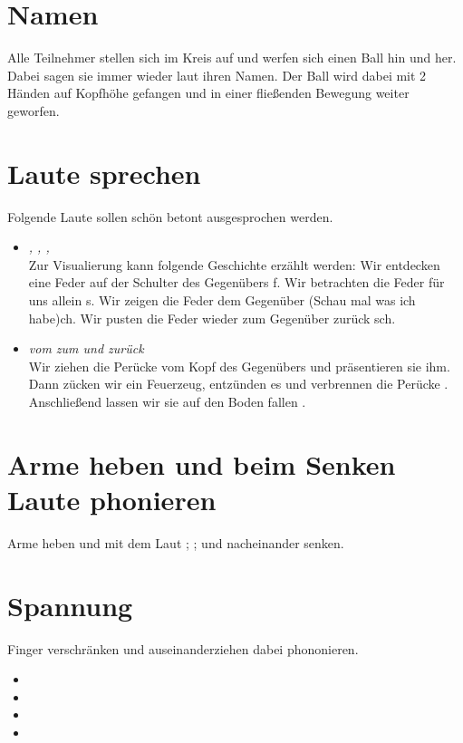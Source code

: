 \documentclass[ngerman, a4paper, twoside]{scrbook}%
\begin{document}
	\section{Namen}
	 Alle Teilnehmer stellen sich im Kreis auf und werfen sich einen Ball hin und her. Dabei sagen sie immer wieder laut ihren Namen. Der Ball wird dabei mit 2 Händen auf Kopfhöhe gefangen und in einer fließenden Bewegung weiter geworfen.

	 \section{Laute sprechen}
	 Folgende Laute sollen schön betont ausgesprochen werden.
	  \begin{itemize}
	  	\item \emph{\textipa{[f]}, \textipa{[s]}, \textipa{[\c{c}]}, \textipa{[\textesh]}}\\
	  	Zur Visualierung kann folgende Geschichte erzählt werden: Wir entdecken eine Feder auf der Schulter des Gegenübers {f}. Wir betrachten die Feder für uns allein {s}. Wir zeigen die Feder dem Gegenüber (Schau mal was ich habe){ch}. Wir pusten die Feder wieder zum Gegenüber zurück {sch}.
	  	\item \emph{vom \textipa{[s]} zum \textipa{[\textesh]} und zurück}\\
	  	Wir ziehen die Perücke vom Kopf des Gegenübers \textipa{[\textesh]} und präsentieren sie ihm. Dann zücken wir ein Feuerzeug, entzünden es \textipa{[s]} und verbrennen die Perücke \textipa{[\textesh]}. Anschließend lassen wir sie auf den Boden fallen \textipa{[ft]}.
	  \end{itemize}
	  \section{Arme heben und beim Senken Laute phonieren}
	  Arme heben und mit dem Laut \textipa{[s]}; \textipa{[z]}; \textipa{[v]} und \textipa{[ft]} nacheinander senken.

		\section{Spannung}
	  Finger verschränken und auseinanderziehen dabei phononieren.
	  \begin{itemize}
	  \item \textipa{[ft]}
	  \item \textipa{[jo]}
	  \item \textipa{[mo]}
	  \item \textipa{[so]]}
	  \end{itemize}
\end{document}
